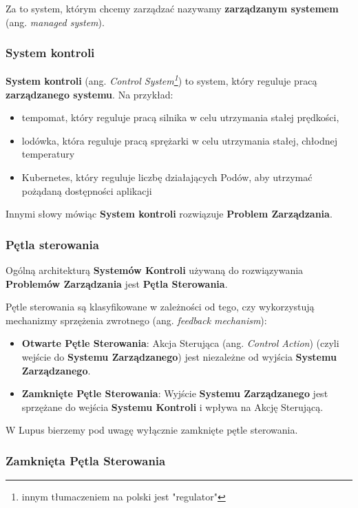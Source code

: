 Za to system, którym chcemy zarządzać nazywamy \textbf{zarządzanym systemem} (ang. \textit{managed system}). 

\subsubsection{System kontroli}

\textbf{System kontroli} (ang. \textit{Control System\footnote{innym tłumaczeniem na polski jest "regulator"}}) to system, który reguluje pracą \textbf{zarządzanego systemu}. Na przykład:
\begin{itemize}
    \item tempomat, który reguluje pracą silnika w celu utrzymania stałej prędkości,
    \item lodówka, która reguluje pracą sprężarki w celu utrzymania stałej, chłodnej temperatury
    \item Kubernetes, który reguluje liczbę działających Podów, aby utrzymać pożądaną dostępności aplikacji
\end{itemize}

Innymi słowy mówiąc \textbf{System kontroli} rozwiązuje \textbf{Problem Zarządzania}.

\subsubsection{Pętla sterowania}

Ogólną architekturą \textbf{Systemów Kontroli} używaną do rozwiązywania \textbf{Problemów Zarządzania} jest \textbf{Pętla Sterowania}.

Pętle sterowania są klasyfikowane w zależności od tego, czy wykorzystują mechanizmy sprzężenia zwrotnego (ang. \textit{feedback mechanism}):
\begin{itemize}
    \item \textbf{Otwarte Pętle Sterowania}: Akcja Sterująca (ang. \textit{Control Action}) (czyli wejście do \textbf{Systemu Zarządzanego}) jest niezależne od wyjścia \textbf{Systemu Zarządzanego}.
    \item \textbf{Zamknięte Pętle Sterowania}: Wyjście \textbf{Systemu Zarządzanego} jest sprzężane do wejścia \textbf{Systemu Kontroli} i wpływa na Akcję Sterującą. 
\end{itemize}

W Lupus bierzemy pod uwagę wyłącznie zamknięte pętle sterowania.

\subsubsection{Zamknięta Pętla Sterowania}

